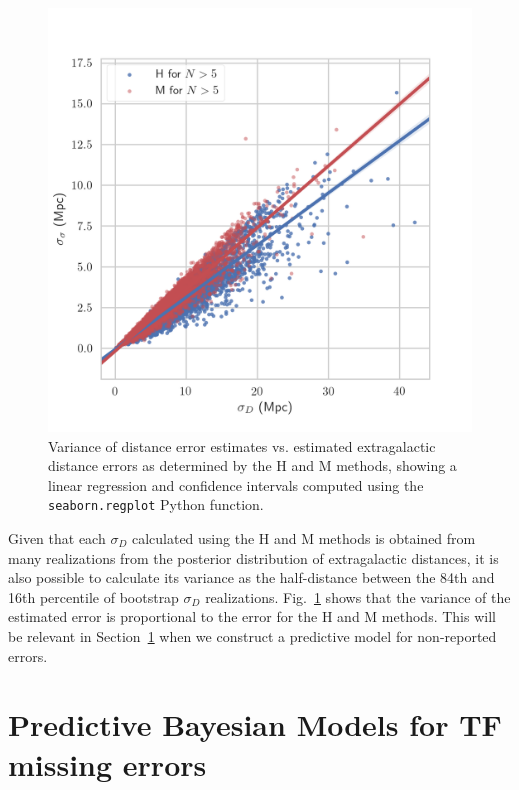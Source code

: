 \documentclass[a4paper,fleqn,usenatbib]{mnras}
\begin{document}
\begin{figure}

	\includegraphics[scale=0.7]{ee.png}
    \caption{Variance of distance error estimates vs. estimated extragalactic distance errors as determined by the H and M methods, showing a linear regression and confidence intervals computed using the \texttt{seaborn.regplot} Python function. }
    \label{fig:ee}
\end{figure}

Given that each $\sigma_D$ calculated using the H and M methods is obtained from many realizations from the posterior distribution of extragalactic distances, it is also possible to calculate its variance as the half-distance between the 84th and 16th percentile of bootstrap $\sigma_D$ realizations. Fig.~\ref{fig:ee} shows that the variance of the estimated error is proportional to the error for the H and M methods. This will be relevant in Section~\ref{sec:predbay} when we construct a predictive model for non-reported errors.

\section{Predictive Bayesian Models for TF missing errors}
\label{sec:predbay} 
\end{document}

